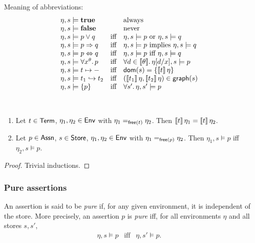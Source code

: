 \documentclass[12pt,a4paper]{article}
\begin{document}
Meaning of abbreviations:
\[\begin{array}{lcl}
  \eta,s \models \mathbf{true}
  && \text{always} \\
  \eta,s \models \mathbf{false}
  && \text{never} \\
  \eta,s \models p \vee q
  &\text{iff}& \eta,s \models p \text{ or } \eta,s \models q \\
  \eta,s \models p \Rightarrow q
  &\text{iff}& \eta,s \models p \text{ implies } \eta,s \models q \\
  \eta,s \models p \Leftrightarrow q
  &\text{iff}& \eta,s \models p \text{ iff } \eta,s \models q \\
  \eta,s \models \forall x^\theta.\,p
  &\text{iff}& \forall d\in \llbracket\theta\rrbracket.\,\eta[d/x],s \models p \\
  \eta,s \models t \mapsto -
  &\text{iff}& \mathsf{dom}(s) = \{\llbracket t\rrbracket\,\eta\} \\
  \eta,s \models t_1 \hookrightarrow t_2
  &\text{iff}& (\llbracket t_1\rrbracket\,\eta,\llbracket t_2\rrbracket\,\eta)\in\mathsf{graph}(s) \\
  \eta,s \models \{p\}
  &\text{iff}& \forall s'.\,\eta,s' \models p
\end{array}\]

\begin{lemma} \
  \begin{enumerate}
  \item Let $t\in\mathsf{Term}$, $\eta_1,\eta_2\in\mathsf{Env}$ with $\eta_1 =_{\mathsf{free}(t)} \eta_2$. Then
    $\llbracket t\rrbracket\,\eta_1 = \llbracket t\rrbracket\,\eta_2$.
  \item Let $p\in\mathsf{Assn}$, $s\in\mathsf{Store}$, $\eta_1,\eta_2\in\mathsf{Env}$ with $\eta_1 =_{\mathsf{free}(p)} \eta_2$. Then
    $\eta_1,s \models p$ iff $\eta_2,s\models p$.
  \end{enumerate}
\end{lemma}

\begin{proof}
  Trivial inductions.
\end{proof}

\subsubsection{Pure assertions}

\begin{definition}
  An assertion is said to be {\em pure} if, for any given environment, it is independent of the store.
  More precisely, an assertion $p$ is {\em pure} iff, for all environments $\eta$ and all stores $s, s'$,
  \[\begin{array}{rcl}
    \eta,s \models p &\text{iff}& \eta,s' \models p.
  \end{array}\]
\end{definition}
\end{document}
